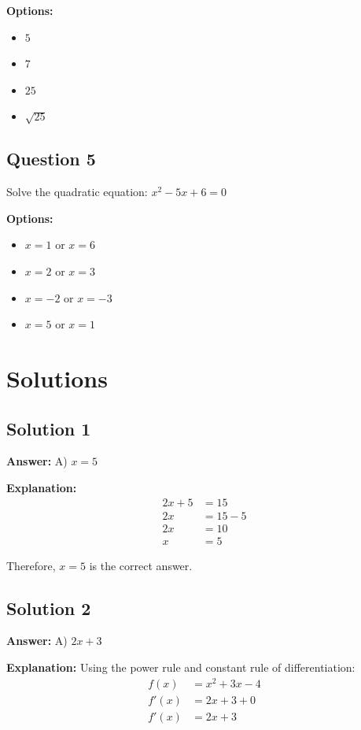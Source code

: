 \documentclass[12pt]{article}
\begin{document}
\textbf{Options:}
\begin{itemize}
    \item[A)] $5$
    \item[B)] $7$
    \item[C)] $25$
    \item[D)] $\sqrt{25}$
\end{itemize}

\subsection*{Question 5}
Solve the quadratic equation: $x^2 - 5x + 6 = 0$

\textbf{Options:}
\begin{itemize}
    \item[A)] $x = 1$ or $x = 6$
    \item[B)] $x = 2$ or $x = 3$
    \item[C)] $x = -2$ or $x = -3$
    \item[D)] $x = 5$ or $x = 1$
\end{itemize}

\newpage

\section*{Solutions}

\subsection*{Solution 1}
\textbf{Answer:} A) $x = 5$

\textbf{Explanation:}
\begin{align*}
    2x + 5 &= 15 \\
    2x &= 15 - 5 \\
    2x &= 10 \\
    x &= 5
\end{align*}

Therefore, $x = 5$ is the correct answer.

\subsection*{Solution 2}
\textbf{Answer:} A) $2x + 3$

\textbf{Explanation:}
Using the power rule and constant rule of differentiation:
\begin{align*}
    f(x) &= x^2 + 3x - 4 \\
    f'(x) &= 2x + 3 + 0 \\
    f'(x) &= 2x + 3
\end{align*}
\end{document}
